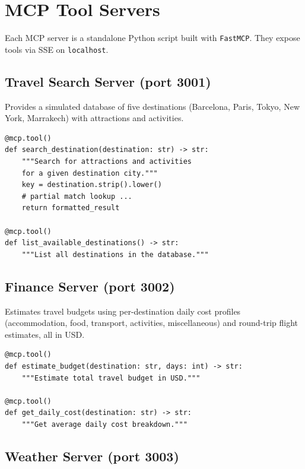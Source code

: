 \documentclass[12pt,a4paper]{article}
\begin{document}
\section{MCP Tool Servers}

Each MCP server is a standalone Python script built with \texttt{FastMCP}.
They expose tools via SSE on \texttt{localhost}.

\subsection{Travel Search Server (port 3001)}

Provides a simulated database of five destinations (Barcelona, Paris, Tokyo,
New York, Marrakech) with attractions and activities.

\begin{lstlisting}
@mcp.tool()
def search_destination(destination: str) -> str:
    """Search for attractions and activities
    for a given destination city."""
    key = destination.strip().lower()
    # partial match lookup ...
    return formatted_result

@mcp.tool()
def list_available_destinations() -> str:
    """List all destinations in the database."""
\end{lstlisting}

\subsection{Finance Server (port 3002)}

Estimates travel budgets using per-destination daily cost profiles
(accommodation, food, transport, activities, miscellaneous) and
round-trip flight estimates, all in USD.

\begin{lstlisting}
@mcp.tool()
def estimate_budget(destination: str, days: int) -> str:
    """Estimate total travel budget in USD."""

@mcp.tool()
def get_daily_cost(destination: str) -> str:
    """Get average daily cost breakdown."""
\end{lstlisting}

\subsection{Weather Server (port 3003)}
\end{document}
